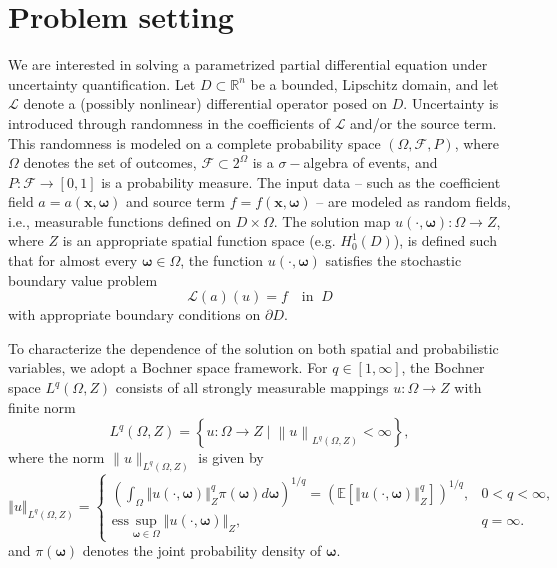 \section{Problem setting}\label{sec:Problem_setting}
We are interested in solving a parametrized partial differential equation under uncertainty quantification. Let $D\subset \mathbb{R}^n$ be a bounded, Lipschitz domain, and let $\mathcal{L}$ denote a (possibly nonlinear) differential operator posed on $D$. Uncertainty is introduced through randomness in the coefficients of $\mathcal{L}$ and/or the source term. This randomness is modeled on a complete probability space $(\Omega, \mathcal{F}, P)$, where $\Omega$ denotes the set of outcomes, $\mathcal{F}\subset 2^{\Omega}$ is a $\sigma-$algebra of events, and $P:\mathcal{F}\rightarrow [0,1]$ is a probability measure. The input data -- such as the coefficient field $a=a(\boldsymbol x, \boldsymbol \omega)$ and source term $f = f(\boldsymbol x, \boldsymbol\omega)$ -- are modeled as random fields, i.e., measurable functions defined on $D\times \Omega$. The solution map $u(\cdot, \boldsymbol{\omega}): \Omega \to Z$, where $Z$ is an appropriate spatial function space (e.g. $H_0^1(D)$), is defined such that for almost every $\boldsymbol\omega\in \Omega$, the function $u(\cdot, \boldsymbol{\omega})$ satisfies the stochastic boundary value problem
%
\begin{equation}\label{eq:Problem}
    \mathcal{L}(a)(u) = f \quad \text{in} \;\; D
\end{equation}
%
with appropriate boundary conditions on $\partial D$. 


To characterize the dependence of the solution on both spatial and probabilistic variables, we adopt a Bochner space framework. For $q\in [1,\infty]$, the Bochner space $L^q(\Omega,Z)$ consists of all strongly measurable mappings $u:\Omega\rightarrow Z$ with finite norm
%
\[
L^q(\Omega,Z) = \left\{u:\Omega\rightarrow Z\; \bigg\vert \;\left\|u\right\|_{L^q(\Omega,Z)}<\infty\right\},
\]
%
where the norm $\|u\|_{L^q(\Omega,Z)}$ is given by
%
\[
\left\Vert u \right\Vert_{L^q(\Omega,Z)} =\left\{\begin{array}{lll}
     \left(\int_{\Omega} \left\Vert u(\cdot,\boldsymbol{\omega})  \right\Vert_{Z}^q \pi(\boldsymbol{\omega})d\boldsymbol{\omega} \right)^{1/q} = \left(\mathbb{E}\left[\left\Vert u(\cdot,\boldsymbol{\omega})  \right\Vert_{Z}^q\right]\right)^{1/q}, & 0<q<\infty, \\
     \text{ess} \sup_{\boldsymbol{\omega}\in \Omega}\left\Vert u(\cdot,\boldsymbol{\omega})  \right\Vert_{Z}, & q=\infty.
\end{array}
\right.
\]
and $\pi(\boldsymbol{\omega})$ denotes the joint probability density of $\boldsymbol{\omega}$.

